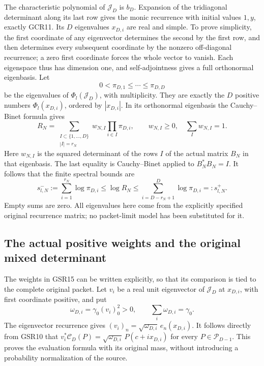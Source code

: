 The characteristic polynomial of $\mathcal J_D$ is $b_D$.
Expansion of the tridiagonal determinant along its last row
gives the monic recurrence with initial values $1,y$, exactly
GCR11. Its $D$ eigenvalues $x_{D,i}$ are real and simple.
To prove simplicity, the first coordinate of any eigenvector
determines the second by the first row, and then determines
every subsequent coordinate by the nonzero off-diagonal
recurrence; a zero first coordinate forces the whole vector
to vanish. Each eigenspace thus has dimension one, and
self-adjointness gives a full orthonormal eigenbasis.
Let
\[
 0<\pi_{D,1}\leq\cdots\leq\pi_{D,D}
\]
be the eigenvalues of $\Phi_l(\mathcal J_D)$, with multiplicity.
They are exactly the $D$ positive numbers
$\Phi_l(x_{D,i})$, ordered by $|x_{D,i}|$.
In its orthonormal eigenbasis the Cauchy--Binet formula gives
\[
 R_N=\sum_{\substack{I\subset\{1,\ldots,D\}\\|I|=r_N}}
       w_{N,I}\prod_{i\in I}\pi_{D,i},\qquad
 w_{N,I}\geq0,\quad\sum_Iw_{N,I}=1.
\tag{GSR15}
\]
Here $w_{N,I}$ is the squared determinant of the rows $I$
of the actual matrix $B_N$ in that eigenbasis. The last equality
is Cauchy--Binet applied to $B_N^*B_N=I$.
It follows that the finite spectral bounds are
\[
 s^-_{l,N}:=\sum_{i=1}^{r_N}\log\pi_{D,i}
       \leq\log R_N
       \leq\sum_{i=D-r_N+1}^D\log\pi_{D,i}
                       =:s^+_{l,N}.
\tag{GSR16}
\]
Empty sums are zero. All eigenvalues here come from the explicitly
specified original recurrence matrix; no packet-limit model has
been substituted for it.

\subsection{The actual positive weights and the original mixed determinant}

The weights in GSR15 can be written explicitly, so that its
comparison is tied to the complete original packet. Let $v_i$
be a real unit eigenvector of $\mathcal J_D$ at $x_{D,i}$,
with first coordinate positive, and put
\[
 \omega_{D,i}=\gamma_0(v_i)_0^2>0,\qquad
                    \sum_i\omega_{D,i}=\gamma_0.
\tag{GSR17}
\]
The eigenvector recurrence gives
$(v_i)_n=\sqrt{\omega_{D,i}}\,e_n(x_{D,i})$.
It follows directly from GSR10 that
$v_i^*\mathcal C_D(P)=
\sqrt{\omega_{D,i}}\,P(c+ix_{D,i})$ for every
$P\in\mathcal P_{D-1}$. This proves the evaluation formula
with its original mass, without introducing a probability
normalization of the source.

